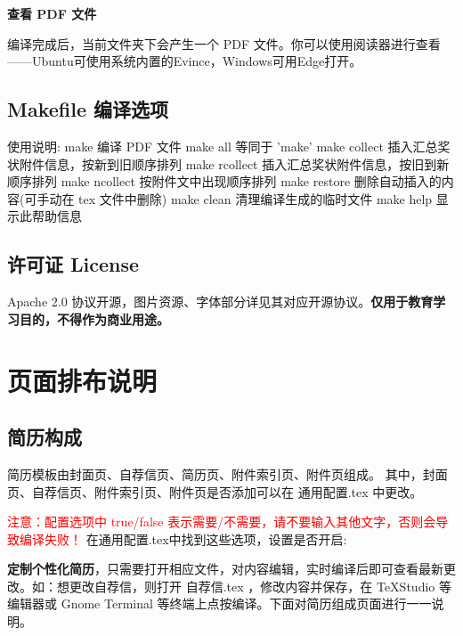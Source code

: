 \documentclass[a4paper,12pt]{ctexart}
\newcommand{\emp}[1]{
	\colorbox{spanbg}{#1}
}
\begin{document}
	\textbf{查看 PDF 文件}
	
	\qquad 编译完成后，当前文件夹下会产生一个 PDF 文件。你可以使用阅读器进行查看——Ubuntu可使用系统内置的Evince，Windows可用Edge打开。
		
	\subsection{Makefile 编译选项}
	\begin{bashcode}
  使用说明:
	make              编译 PDF 文件
	make all          等同于 'make'
	make collect      插入汇总奖状附件信息，按新到旧顺序排列
	make rcollect     插入汇总奖状附件信息，按旧到新顺序排列
	make ncollect     按附件文中出现顺序排列
	make restore      删除自动插入的内容(可手动在 tex 文件中删除)
	make clean        清理编译生成的临时文件
	make help         显示此帮助信息
	
	\end{bashcode}
	
	\subsection{许可证 License}
	Apache 2.0 协议开源，图片资源、字体部分详见其对应开源协议。\textbf{仅用于教育学习目的，不得作为商业用途。}
	
	\newpage
	\section{页面排布说明}
	
	\subsection{简历构成}
	简历模板由封面页、自荐信页、简历页、附件索引页、附件页组成。
	其中，封面页、自荐信页、附件索引页、附件页是否添加可以在\emp{通用配置.tex}中更改。
	
	\textcolor{red}{注意：配置选项中 true/false 表示需要/不需要，请不要输入其他文字，否则会导致编译失败！}
	在通用配置.tex中找到这些选项，设置是否开启:
	\begin{latexcode}
    \def\theCoverPageNeed{false} %
    \def\theCoverLetterNeed{true}  %
    \def\theAttachmentIndexPageNeed{true} %
    \def\theAttachmentPageNeed{true}  %
	\end{latexcode}
	
	\textbf{定制个性化简历}，只需要打开相应文件，对内容编辑，实时编译后即可查看最新更改。如：想更改自荐信，则打开 \emp{自荐信.tex}，修改内容并保存，在\emp{TeXStudio}等编辑器或\emp{Gnome Terminal}等终端上点按编译。下面对简历组成页面进行一一说明。
	
\end{document}
